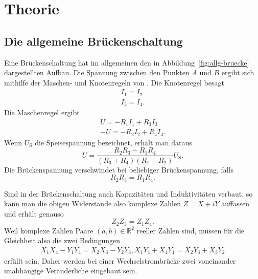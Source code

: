 \section{Theorie}
\label{sec:theorie}

\subsection{Die allgemeine Brückenschaltung}
\label{sec:allg-bruecke}

Eine Brückenschaltung hat im allgemeinen den in
Abbildung~\ref{fig:allg-bruecke} dargestellten Aufbau.  Die Spannung
zwischen den Punkten $A$ und $B$ ergibt sich mithilfe der Maschen- und
Knotenregeln von . Die Knotenregel besagt
\begin{gather}
  I_1 = I_2\\
  I_3 = I_4.
\end{gather}
Die Maschenregel ergibt
\begin{gather}
  U = -R_1 I_1 + R_3 I_3\\
 -U = -R_2 I_2 + R_4 I_4.
\end{gather}
Wenn $U_\text{S}$ die Speisespannung bezeichnet, erhält man daraus
\begin{equation}
  U = \frac{R_2 R_3 - R_1 R_4}{(R_3 + R_4)(R_1 + R_2)} U_\text{S}.
\end{equation}
Die Brückenspannung verschwindet bei beliebiger Brückenspannung, falls
\begin{equation}
  \label{eq:abgleich}
  R_2 R_3 = R_1 R_4.
\end{equation}

Sind in der Brückenschaltung auch Kapazitäten und Induktivitäten
verbaut, so kann man die obigen Widerstände also komplexe Zahlen $Z =
X + iY$ auffassen und erhält genauso
\begin{equation}
  \label{eq:abgleich-komplex}
  Z_2 Z_3 = Z_1 Z_4.
\end{equation}
Weil komplexe Zahlen Paare $(a, b)\in\mathbb{R}^2$ reeller Zahlen
sind, müssen für die Gleichheit also die zwei Bedingungen
\begin{gather}
  X_1 X_4 - Y_1 Y_4 = X_2 X_3 - Y_2 Y_3,
  X_1 Y_4 + X_4 Y_1 = X_2 Y_3 + X_3 Y_2
\end{gather}
erfüllt sein.  Daher werden bei einer Wechselstrombrücke zwei
voneinander unabhängige Veränderliche eingebaut sein.

